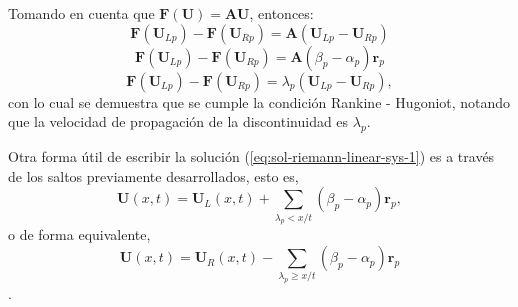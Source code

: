 Tomando en cuenta que $\mathbf{F}(\mathbf{U}) = \mathbf{A}\mathbf{U}$, entonces:
\begin{equation}
 	\mathbf{F}(\mathbf{U}_{Lp}) - \mathbf{F}(\mathbf{U}_{Rp}) = \mathbf{A}(\mathbf{U}_{Lp} - \mathbf{U}_{Rp})
\end{equation}
\begin{equation}
	\mathbf{F}(\mathbf{U}_{Lp}) - \mathbf{F}(\mathbf{U}_{Rp}) = \mathbf{A}(\beta_{p} - \alpha_{p})\mathbf{r}_p
\end{equation}
\begin{equation}
	\mathbf{F}(\mathbf{U}_{Lp}) - \mathbf{F}(\mathbf{U}_{Rp}) = \lambda_{p}(\mathbf{U}_{Lp} - \mathbf{U}_{Rp}),
\end{equation}
con lo cual se demuestra que se cumple la condición Rankine - Hugoniot, notando que la velocidad de propagación de la discontinuidad es $\lambda_p$.

Otra forma útil de escribir la solución (\ref{eq:sol-riemann-linear-sys-1}) es a través de los saltos previamente desarrollados, esto es,
\begin{equation}
	\mathbf{U}(x,t) = \mathbf{U}_{L}(x,t) + \sum_{\lambda_{p} < x/t} (\beta_{p} - \alpha_{p}) \mathbf{r}_{p},
\end{equation}
o de forma equivalente,
\begin{equation}
	\mathbf{U}(x,t) = \mathbf{U}_{R}(x,t) - \sum_{\lambda_{p} \geq x/t} (\beta_{p} - \alpha_{p}) \mathbf{r}_{p} 
\end{equation}.